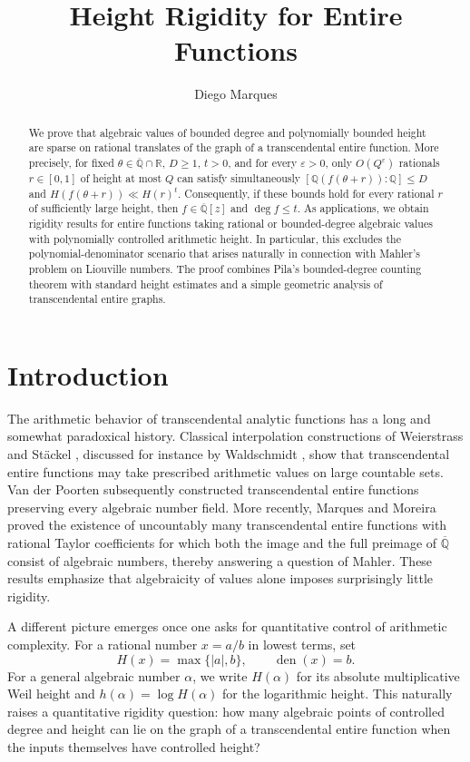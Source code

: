 \documentclass[11pt]{amsart}
\title[Height rigidity for entire functions]{Height Rigidity for Entire Functions}
\author{Diego Marques}
\theoremstyle{remark}
\newcommand{\Q}{\mathbb{Q}}
\newcommand{\R}{\mathbb{R}}
\newcommand{\Qbar}{\overline{\mathbb{Q}}}
\DeclareMathOperator{\den}{den}
\begin{document}
\begin{abstract}
We prove that algebraic values of bounded degree and polynomially bounded height are sparse on rational translates of the graph of a transcendental entire function. More precisely, for fixed $\theta\in\Qbar\cap\R$, $D\geq1$, $t>0$, and for every $\varepsilon>0$, only $O(Q^{\varepsilon})$ rationals $r\in[0,1]$ of height at most $Q$ can satisfy simultaneously $[\Q(f(\theta+r)):\Q]\leq D$ and $H(f(\theta+r))\ll H(r)^t$. Consequently, if these bounds hold for every rational $r$ of sufficiently large height, then $f\in\Qbar[z]$ and $\deg f\leq t$. As applications, we obtain rigidity results for entire functions taking rational or bounded-degree algebraic values with polynomially controlled arithmetic height. In particular, this excludes the polynomial-denominator scenario that arises naturally in connection with Mahler's problem on Liouville numbers. The proof combines Pila's bounded-degree counting theorem with standard height estimates and a simple geometric analysis of transcendental entire graphs.
\end{abstract}

\maketitle

\section{Introduction}

The arithmetic behavior of transcendental analytic functions has a long and somewhat paradoxical history. Classical interpolation constructions of Weierstrass \cite{Weierstrass1923} and St\"ackel \cite{Stackel}, discussed for instance by Waldschmidt \cite{Waldschmidt2003}, show that transcendental entire functions may take prescribed arithmetic values on large countable sets. Van der Poorten \cite{vanderPoorten1968} subsequently constructed transcendental entire functions preserving every algebraic number field. More recently, Marques and Moreira \cite{MarquesMoreira2017} proved the existence of uncountably many transcendental entire functions with rational Taylor coefficients for which both the image and the full preimage of $\Qbar$ consist of algebraic numbers, thereby answering a question of Mahler. These results emphasize that algebraicity of values alone imposes surprisingly little rigidity.

A different picture emerges once one asks for quantitative control of arithmetic complexity. For a rational number $x=a/b$ in lowest terms, set
\[
H(x)=\max\{|a|,b\},
\qquad
\den(x)=b.
\]
For a general algebraic number $\alpha$, we write $H(\alpha)$ for its absolute multiplicative Weil height and $h(\alpha)=\log H(\alpha)$ for the logarithmic height. This naturally raises a quantitative rigidity question: how many algebraic points of controlled degree and height can lie on the graph of a transcendental entire function when the inputs themselves have controlled height?
\end{document}
